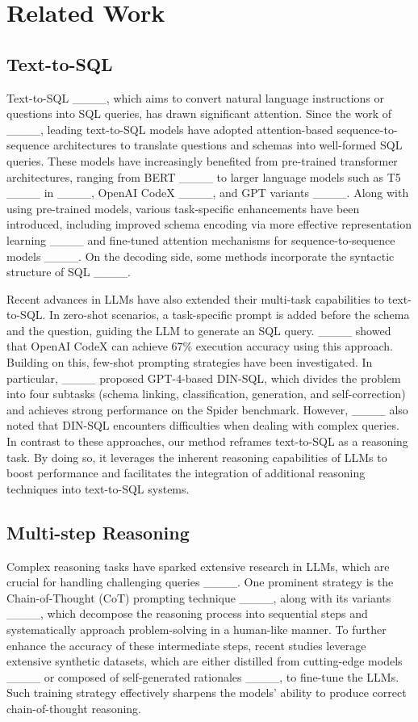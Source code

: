 \section{Related Work}
\subsection{Text-to-SQL}
Text-to-SQL ____, which aims to convert natural language instructions or questions into SQL queries, has drawn significant attention. Since the work of ____, leading text-to-SQL models have adopted attention-based sequence-to-sequence architectures to translate questions and schemas into well-formed SQL queries. These models have increasingly benefited from pre-trained transformer architectures, ranging from BERT ____ to larger language models such as T5 ____ in ____, OpenAI CodeX ____, and GPT variants ____. Along with using pre-trained models, various task-specific enhancements have been introduced, including improved schema encoding via more effective representation learning ____ and fine-tuned attention mechanisms for sequence-to-sequence models ____. On the decoding side, some methods incorporate the syntactic structure of SQL ____.

Recent advances in LLMs have also extended their multi-task capabilities to text-to-SQL. In zero-shot scenarios, a task-specific prompt is added before the schema and the question, guiding the LLM to generate an SQL query. ____ showed that OpenAI CodeX can achieve 67\% execution accuracy using this approach. Building on this, few-shot prompting strategies have been investigated. In particular, ____ proposed GPT-4-based DIN-SQL, which divides the problem into four subtasks (schema linking, classification, generation, and self-correction) and achieves strong performance on the Spider benchmark. However, ____ also noted that DIN-SQL encounters difficulties when dealing with complex queries. In contrast to these approaches, our method reframes text-to-SQL as a reasoning task. By doing so, it leverages the inherent reasoning capabilities of LLMs to boost performance and facilitates the integration of additional reasoning techniques into text-to-SQL systems.

\subsection{Multi-step Reasoning}
Complex reasoning tasks have sparked extensive research in LLMs, which are crucial for handling challenging queries ____. One prominent strategy is the Chain-of-Thought (CoT) prompting technique ____, along with its variants ____, which decompose the reasoning process into sequential steps and systematically approach problem-solving in a human-like manner. To further enhance the accuracy of these intermediate steps, recent studies leverage extensive synthetic datasets, which are either distilled from cutting-edge models ____ or composed of self-generated rationales ____, to fine-tune the LLMs. Such training strategy effectively sharpens the models' ability to produce correct chain-of-thought reasoning.

